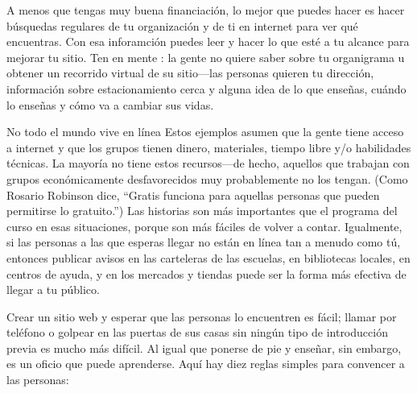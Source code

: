A menos que tengas muy buena financiación,
lo mejor que puedes hacer es hacer búsquedas regulares de tu organización y de ti en internet 
para ver qué encuentras.
Con esa inforamción puedes leer 
y hacer lo que esté a tu alcance para mejorar tu sitio.
Ten en mente :
la gente no quiere saber sobre tu organigrama u obtener un recorrido virtual de su sitio---las personas quieren tu dirección,
información sobre estacionamiento cerca 
y alguna idea de lo que enseñas,
cuándo lo enseñas
y cómo va a cambiar sus vidas.


\begin{aside}{No todo el mundo vive en línea}
Estos ejemplos asumen que la gente tiene acceso a internet y que los grupos 
tienen dinero, materiales, tiempo libre y/o habilidades técnicas.
La mayoría no tiene estos recursos---de hecho,
aquellos que trabajan con grupos económicamente desfavorecidos muy probablemente no los tengan.
(Como Rosario Robinson dice, ``Gratis funciona para aquellas personas que pueden permitirse lo gratuito.'')
Las historias son más importantes que el programa del curso en esas situaciones,
porque son más fáciles de volver a contar.
Igualmente,
si las personas a las que esperas llegar no están en línea tan a menudo como tú,
entonces publicar avisos en las carteleras de las escuelas,
en bibliotecas locales,
en centros de ayuda,
y en los mercados y tiendas puede ser la forma más efectiva de llegar a tu público.
\end{aside}



Crear un sitio web y esperar que las personas lo encuentren es fácil;
llamar por teléfono o golpear en las puertas de sus casas sin ningún tipo de introducción previa es mucho más difícil.
Al igual que ponerse de pie y enseñar,
sin embargo, es un oficio que puede aprenderse.
 Aquí hay diez reglas simples para convencer a las personas:

